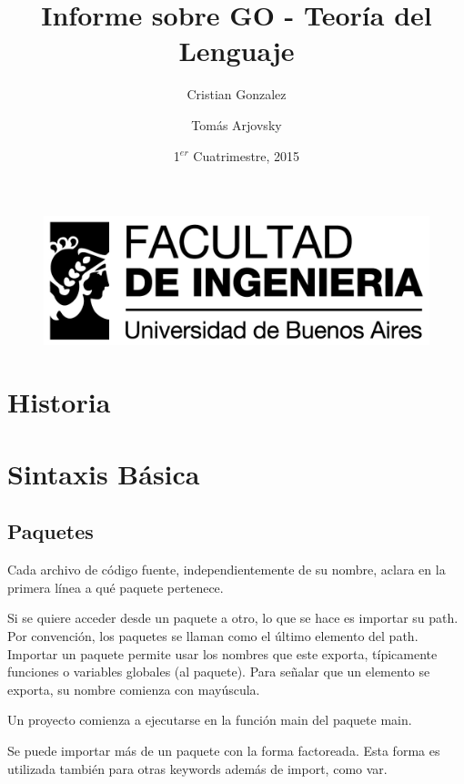\documentclass{article}
\begin{document}
\begin{figure}
	\centering
	\includegraphics[width=0.9\linewidth]{./logo_fiuba_alta}
	\label{fig:logo_fiuba_alta}
\end{figure}

\title{Informe sobre GO - Teoría del Lenguaje}
\author{Cristian Gonzalez \and Tomás Arjovsky}
\date{1$^{er}$ Cuatrimestre, 2015}
\maketitle

\tableofcontents

\section{Historia}
\section{Sintaxis Básica}
\subsection{Paquetes}
Cada archivo de código fuente, independientemente de su nombre, aclara en la primera línea a qué paquete pertenece.

Si se quiere acceder desde un paquete a otro, lo que se hace es importar su path. Por convención, los paquetes se llaman como el último elemento del path. Importar un paquete permite usar los nombres que este exporta, típicamente funciones o variables globales (al paquete). Para señalar que un elemento se exporta, su nombre comienza con mayúscula.

Un proyecto comienza a ejecutarse en la función main del paquete main.



Se puede importar más de un paquete con la forma factoreada. Esta forma es utilizada también para otras keywords además de import, como var.
\end{document}
